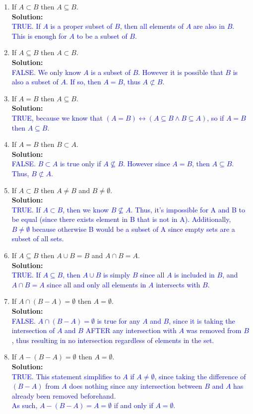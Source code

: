 \documentclass{article}
\newcommand{\sol}[1]{\textbf{Solution:\,}\textcolor{blue}{#1}}
\begin{document}
\begin{enumerate}
\begin{enumerate}
\item If $A \subset B$ then $A \subseteq B$.
\\\sol{
\\TRUE. If $A$ is a proper subset of $B$, then all elements of $A$ are also in $B$. This is enough for $A$ to be a subset of $B$.
}
\item If $A \subseteq B$ then $A \subset B$.
\\\sol{
\\FALSE. We only know $A$ is a subset of $B$. However it is possible that $B$ is also a subset of $A$. If so, then $A=B$, thus $A\not\subset B$.
}
\item If $A = B$ then $A \subseteq B$.
\\\sol{
\\TRUE, because we know that $(A=B)\leftrightarrow(A\subseteq B\land B\subseteq A)$, so if $A=B$ then $A\subseteq B$.
}
\item If $A = B$ then $B \subset A$.
\\\sol{
\\FALSE. $B\subset A$ is true only if $A\not\subseteq B$. However since $A=B$, then $A\subseteq B$. Thus, $B\not\subset A$.
}
\item If $A \subset B$ then $A \neq B$ and $B \neq \emptyset$.
\\\sol{
\\TRUE. If $A\subset B$, then we know $B\not\subseteq A$. Thus, it's impossible for A and B to be equal (since there exists element in B that is not in A). Additionally, $B\neq\emptyset$ because otherwise B would be a subset of A since empty sets are a subset of all sets.
}
\item If $A \subseteq B$ then $A \cup B = B$ and $A \cap B = A$.
\\\sol{
\\TRUE. If $A\subseteq B$, then $A\cup B$ is simply $B$ since all $A$ is included in $B$, and $A \cap B = A$ since all and only all elements in $A$ intersects with $B$.
}
\item If $A \cap (B - A) = \emptyset$ then $A = \emptyset$.
\\\sol{
\\FALSE. $A \cap (B - A) = \emptyset$ is true for any $A$ and $B$, since it is taking the intersection of $A$ and $B$ AFTER any intersection with $A$ was removed from $B$, thus resulting in no intersection regardless of elements in the set.
}
\item If $A - (B - A) = \emptyset$ then $A = \emptyset$.
\\\sol{
\\TRUE. This statement simplifies to $A$ if $A\neq\emptyset$, since taking the difference of $(B-A)$ from $A$ does nothing since any intersection between $B$ and $A$ has already been removed beforehand. 
\\As such, $A - (B - A) = A =\emptyset$ if and only if $A=\emptyset$.
}
\end{enumerate}


\end{enumerate}
\end{document}
